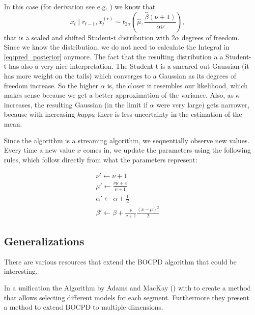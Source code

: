 \documentclass[12pt,a4paper]{article}
\begin{document}
In this case (for derivation see e.g. \cite{Murphy:ConjugateBayesiananalysis}) we know that
\begin{equation} \label{eg:xt_t_distribution}
x_t \mid r_{t-1}, x_{t}^{(r)} \sim t_{2\alpha}\left(\hat\mu, \frac{\hat\beta(\nu + 1)}{\alpha\nu}\right),
\end{equation}
that is a scaled and shifted Student-t distribution with $2\alpha$ degrees of freedom. Since we know the distribution, we do not need to calculate the Integral in \eqref{eq:pred_posterior} anymore. The fact that the resulting distribution a a Student-t has also a very nice interpretation. The Student-t is a smeared out Gaussian (it has more weight on the tails) which converges to a Gaussian as its degrees of freedom increase. So the higher $\alpha$ is, the closer it resembles our likelihood, which makes sense because we get a better approximation of the variance. Also, as $\kappa$ increases, the resulting Gaussian (in the limit if $\alpha$ were very large) gets narrower, because with increasing $kappa$ there is less uncertainty in the estimation of the mean.

Since the algorithm is a streaming algorithm, we sequentially observe new values. Every time a new value $x$ comes in, we update the parameters using the following rules, which follow directly from what the parameters represent:

\begin{equation*}
\begin{gathered}
\nu' \leftarrow \nu + 1 \\
\mu' \leftarrow \frac{\nu \mu + x}{\nu + 1} \\
\alpha' \leftarrow \alpha + \frac12 \\
\beta' \leftarrow \beta + \frac{\nu}{\nu + 1} \frac{(x - \mu)^2}{2}
\end{gathered}
\end{equation*}

\subsection{Generalizations}
There are various resources that extend the BOCPD algorithm that could be interesting. 

In \cite{Knoblauch:SpatiotemporalBayesian} a unification the Algorithm by Adams and MacKay (\cite{Adams:BayesianOnlineChangepoint}) with \cite{Fearnhead:lineinferencemultiple} to create a method that allows selecting different models for each segment. Furthermore they present a method to extend BOCPD to multiple dimensions.
\end{document}
